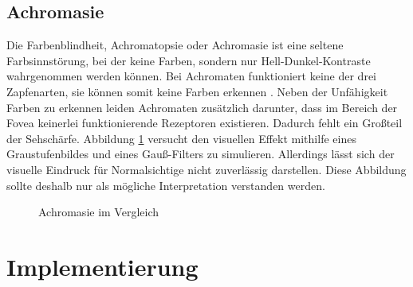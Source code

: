 \documentclass[a4paper]{article}
\begin{document}
\subsection*{Achromasie}
Die Farbenblindheit, Achromatopsie oder Achromasie ist eine seltene Farbsinnstörung, bei der keine Farben, sondern nur Hell-Dunkel-Kontraste wahrgenommen werden können. Bei Achromaten funktioniert keine der drei Zapfenarten, sie können somit keine Farben erkennen \cite{WP-A}. Neben der Unfähigkeit Farben zu erkennen leiden Achromaten zusätzlich darunter, dass im Bereich der Fovea keinerlei funktionierende Rezeptoren existieren. Dadurch fehlt ein Großteil der Sehschärfe. Abbildung \ref{achromate} versucht den visuellen Effekt mithilfe eines Graustufenbildes und eines Gauß-Filters zu simulieren. Allerdings lässt sich der visuelle Eindruck für Normalsichtige nicht zuverlässig darstellen. Diese Abbildung sollte deshalb nur als mögliche Interpretation verstanden werden.

\begin{figure}[H]
\centering
{}
\caption{Achromasie im Vergleich}
\label{achromate}
\end{figure}

\newpage

\section*{Implementierung}

\newpage

\nocite{WP-RG}
\nocite{WP-GF}
\nocite{ANDROID}
\nocite{GIZMODO}
\nocite{IBFB}
\printbibliography

\listoffigures
\end{document}
